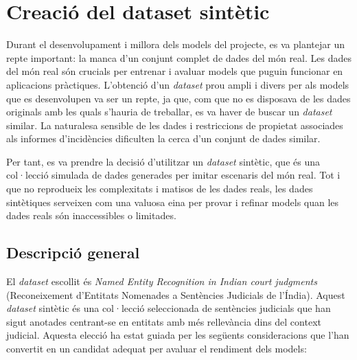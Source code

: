 \section{Creació del dataset sintètic}

Durant el desenvolupament i millora dels models del projecte, es va plantejar un repte important: la manca d'un conjunt complet de dades del món real. Les dades del món real són crucials per entrenar i avaluar models que puguin funcionar en aplicacions pràctiques. L'obtenció d'un \textit{dataset} prou ampli i divers per als models que es desenvolupen va ser un repte, ja que, com que no es disposava de les dades originals amb les quals s'hauria de treballar, es va haver de buscar un \textit{dataset} similar. La naturalesa sensible de les dades i restriccions de propietat associades als informes d'incidències dificulten la cerca d'un conjunt de dades similar.

Per tant, es va prendre la decisió d'utilitzar un \textit{dataset} sintètic, que és una col·lecció simulada de dades generades per imitar escenaris del món real. Tot i que no reprodueix les complexitats i matisos de les dades reals, les dades sintètiques serveixen com una valuosa eina per provar i refinar models quan les dades reals són inaccessibles o limitades.

\subsection{Descripció general}
El \textit{dataset} escollit és \textit{Named Entity Recognition in Indian court judgments} \cite{dataset} (Reconeixement d'Entitats Nomenades a Sentències Judicials de l'Índia). Aquest \textit{dataset} sintètic és una col·lecció seleccionada de sentències judicials que han sigut anotades centrant-se en entitats amb més rellevància dins del context judicial. Aquesta elecció ha estat guiada per les següents consideracions que l'han convertit en un candidat adequat per avaluar el rendiment dels models:

